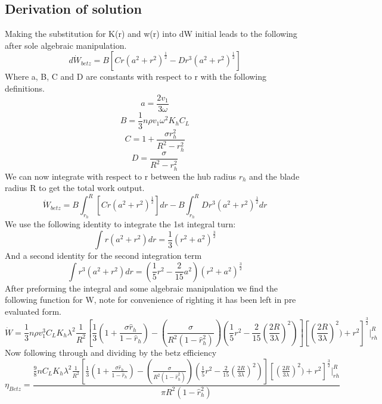\documentclass[11pt,a4paper]{article}
\begin{document}
\subsection*{Derivation of solution}
Making the substitution for K(r) and w(r) into dW initial leads to the following after sole algebraic manipulation.
\begin{equation}
d\dot{W}_{betz} = B[Cr(a^2+r^2)^{\frac{1}{2}}-Dr^3(a^2+r^2)^{\frac{1}{2}}]
\end{equation}
Where a, B, C and D are constants with respect to r with the following definitions.
\begin{equation}
a = \frac{2v_1}{3\omega}
\end{equation}
\begin{equation}
B = \frac{1}{3}n\rho v_1 \omega^2 K_h C_L
\end{equation}
\begin{equation}
C = 1+\frac{\sigma r^2_h}{R^2 - r^2_h}
\end{equation}
\begin{equation}
D = \frac{\sigma}{R^2 - r^2_h}
\end{equation}
We can now integrate with respect to r between the hub radius $r_h$ and the blade radius R to get the total work output.
\begin{equation}
\dot{W}_{betz} = B\int_{r_h}^R [Cr(a^2+r^2)^{\frac{1}{2}}]dr-B\int_{r_h}^R Dr^3(a^2+r^2)^{\frac{1}{2}}dr
\end{equation}
We use the following identity to integrate the 1st integral turn:
\begin{equation}
\int r(a^2+r^2)dr = \frac{1}{3}(r^2 +a^2)^{\frac{3}{2}}
\end{equation}
And a second identity for the second integration term
\begin{equation}
\int r^3(a^2+r^2)dr = (\frac{1}{5}r^2 -\frac{2}{15}a^2)(r^2 +a^2)^\frac{3}{2}
\end{equation}
After preforming the integral and some algebraic manipulation we find the following function for W, note for convenience of righting it has been left in pre evaluated form.
\begin{equation}
\dot{W} = \frac{1}{3} n\rho v^3_1 C_L K_h \lambda^2 \frac{1}{R^2}[\frac{1}{3}(1+\frac{\sigma \hat{r}_h}{1-\hat{r}_h})-(\frac{\sigma}{R^2(1-\hat{r}^2_h)})(\frac{1}{5}r^2-\frac{2}{15}(\frac{2R}{3\lambda})^2)][(\frac{2R}{3\lambda})^2)+r^2]^{\frac{3}{2}}\Big|_{rh}^R
\end{equation}
Now following through and dividing by the betz efficiency
\begin{equation}
\eta_{Betz} = \frac{\frac{9}{8} n C_L K_h \lambda^2 \frac{1}{R^2}[\frac{1}{3}(1+\frac{\sigma \hat{r}_h}{1-\hat{r}_h})-(\frac{\sigma}{R^2(1-\hat{r}^2_h)})(\frac{1}{5}r^2-\frac{2}{15}(\frac{2R}{3\lambda})^2)][(\frac{2R}{3\lambda})^2)+r^2]^{\frac{3}{2}}\Big|_{rh}^R}{\pi R^2(1-\hat{r}^2_h)}
\end{equation}
\end{document}
